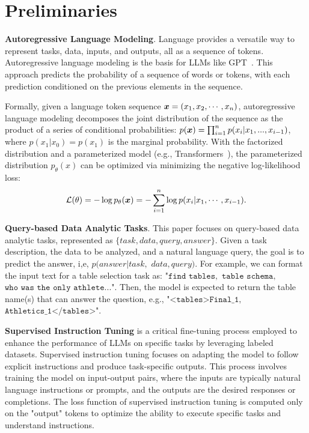 \section{Preliminaries}
\noindent \textbf{Autoregressive Language Modeling}.
Language provides a versatile way to represent tasks, data, inputs, and outputs, all as a sequence of tokens. Autoregressive language modeling is the basis for LLMs like GPT~\citep{gpt2,gpt3}. This approach predicts the probability of a sequence of words or tokens, with each prediction conditioned on the previous elements in the sequence. 

Formally, given a language token sequence ${\bm{x}} = (x_1, x_2, \cdots, x_n)$, autoregressive language modeling decomposes the joint distribution of the sequence as the product of a series of conditional probabilities: $p({\bm{x}}) = \prod_{i=1}^n p(x_i|x_1, ..., x_{i-1})$,
where $p(x_1|x_0) = p(x_1)$ is the marginal probability. With the factorized distribution and a parameterized model (e.g., Transformers~\cite{vaswani2017attention}), the parameterized distribution $p_{\theta}(x)$ can be optimized via minimizing the negative log-likelihood loss:
\begin{equation}\label{eqn:loss-ar}
    {\mathcal{L}}(\theta) = -\log p_{\theta}({\bm{x}}) = - \sum\limits_{i=1}^n \log p(x_i|x_{1},\cdots, x_{i-1}).
\end{equation}

\vspace{3pt}
\noindent \textbf{Query-based Data Analytic Tasks}. This paper focuses on query-based data analytic tasks, represented as $\{task, data, query, answer\}$. Given a task description, the data to be analyzed, and a natural language query, the goal is to predict the answer, i,e, $p(answer|task,$ $data, query)$. For example, we can format the input text for a table selection task as: "$\texttt{find tables},$ $\texttt{table schema},~$ $\texttt{who was the}$ $\texttt{only athlete...}$". Then, the model is expected to return the table name(s) that can answer the question, e.g., "$\texttt{<tables>Final\_1},$ $\texttt{Athletics\_1</tables>}$".

\vspace{3pt}

\noindent \textbf{Supervised Instruction Tuning} is a critical fine-tuning process employed to enhance the performance of LLMs on specific tasks by leveraging labeled datasets. Supervised instruction tuning focuses on adapting the model to follow explicit instructions and produce task-specific outputs. This process involves training the model on input-output pairs, where the inputs are typically natural language instructions or prompts, and the outputs are the desired responses or completions. The loss function of supervised instruction tuning is computed only on the "output" tokens to optimize the ability to execute specific tasks and understand instructions.